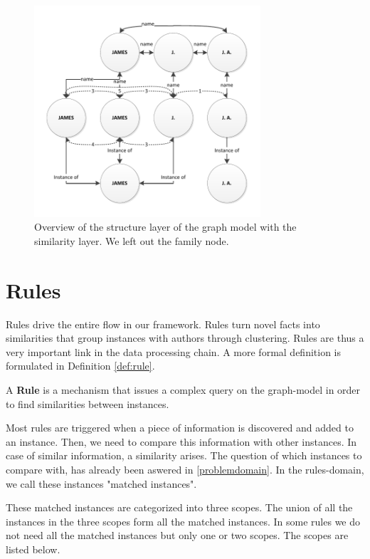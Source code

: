 \begin{figure}[htb]
	\centering
		\includegraphics[width=0.75\textwidth]{fig/graphstructureoverviewsim}
	\caption{Overview of the structure layer of the graph model with the similarity layer. We left out the family node.}
	\label{fig:graphstructureoverviewsim}
\end{figure}

\section{Rules}
\label{rules}

Rules drive the entire flow in our framework. Rules turn novel facts into similarities that group instances with authors through clustering. Rules are thus a very important link in the data processing chain. A more formal definition is formulated in Definition \autoref{def:rule}.

\begin{mydef}
\label{def:rule}
A \textbf{Rule} is a mechanism that issues a complex query on the graph-model in order to find similarities between instances.
\end{mydef}

Most rules are triggered when a piece of information is discovered and added to an instance. Then, we need to compare this information with other instances. In case of similar information, a similarity arises. The question of which instances to compare with, has already been aswered in \autoref{problemdomain}. In the rules-domain, we call these instances "matched instances".

These matched instances are categorized into three scopes. The union of all the instances in the three scopes form all the matched instances. In some rules we do not need all the matched instances but only one or two scopes. The scopes are listed below.

